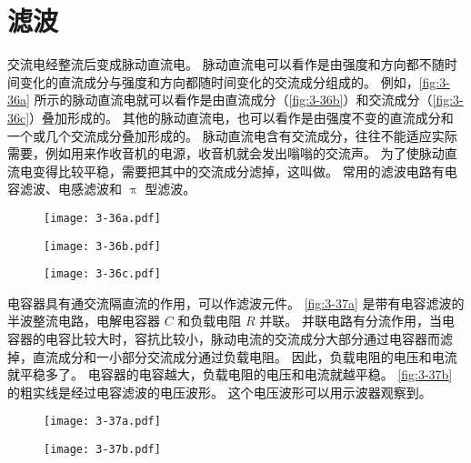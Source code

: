 \section{滤波}
交流电经整流后变成脉动直流电。
脉动直流电可以看作是由强度和方向都不随时间变化的直流成分与强度和方向都随时间变化的交流成分组成的。
例如，\cref{fig:3-36a} 所示的脉动直流电就可以看作是由直流成分（\cref{fig:3-36b}）和交流成分（\cref{fig:3-36c}）叠加形成的。
其他的脉动直流电，也可以看作是由强度不变的直流成分和一个或几个交流成分叠加形成的。
脉动直流电含有交流成分，往往不能适应实际需要，例如用来作收音机的电源，收音机就会发出嗡嗡的交流声。
为了使脉动直流电变得比较平稳，需要把其中的交流成分滤掉，这叫做。
常用的滤波电路有电容滤波、电感滤波和 $\uppi$ 型滤波。
\begin{figure}
  \begin{minipage}{0.1\linewidth}\centering
    \subcaption{}\label{fig:3-36a}
  \end{minipage}%
  \begin{minipage}{0.7\linewidth}\centering
    \texttt{[image: 3-36a.pdf]}
  \end{minipage}
  \begin{minipage}{0.1\linewidth}\centering
    \subcaption{}\label{fig:3-36b}
  \end{minipage}%
  \begin{minipage}{0.7\linewidth}\centering
    \texttt{[image: 3-36b.pdf]}
  \end{minipage}
  \begin{minipage}{0.1\linewidth}\centering
    \subcaption{}\label{fig:3-36c}
  \end{minipage}%
  \begin{minipage}{0.7\linewidth}\centering
    \texttt{[image: 3-36c.pdf]}
  \end{minipage}
  \caption{}\label{fig:3-36}
\end{figure}

电容器具有通交流隔直流的作用，可以作滤波元件。
\cref{fig:3-37a} 是带有电容滤波的半波整流电路，电解电容器 $C$ 和负载电阻 $R$ 并联。
并联电路有分流作用，当电容器的电容比较大时，容抗比较小，脉动电流的交流成分大部分通过电容器而滤掉，直流成分和一小部分交流成分通过负载电阻。
因此，负载电阻的电压和电流就平稳多了。
电容器的电容越大，负载电阻的电压和电流就越平稳。
\cref{fig:3-37b} 的粗实线是经过电容滤波的电压波形。
这个电压波形可以用示波器观察到。
\begin{figure}
  \begin{minipage}[b]{0.48\linewidth}\centering
    \texttt{[image: 3-37a.pdf]}
    \subcaption{}\label{fig:3-37a}
  \end{minipage}
  \begin{minipage}[b]{0.48\linewidth}\centering
    \texttt{[image: 3-37b.pdf]}
    \subcaption{}\label{fig:3-37b}
  \end{minipage}
  \caption{}\label{fig:3-37}
\end{figure}

